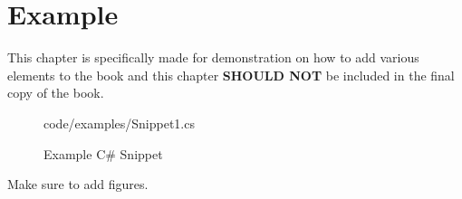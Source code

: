\chapter{Example}

This chapter is specifically made for demonstration on how to add various elements to the book and this chapter \textbf{SHOULD NOT} be included in the final copy of the book.

\begin{figure}[h]
    \centering
    \colorbox{backgroundcolor}{
        \parbox{0.9\textwidth}{
            
            {code/examples/Snippet1.cs}
        }
    }
    \caption{Example C\# Snippet}
    \label{fig:example_cs_snippet}
\end{figure}


Make sure to add figures.